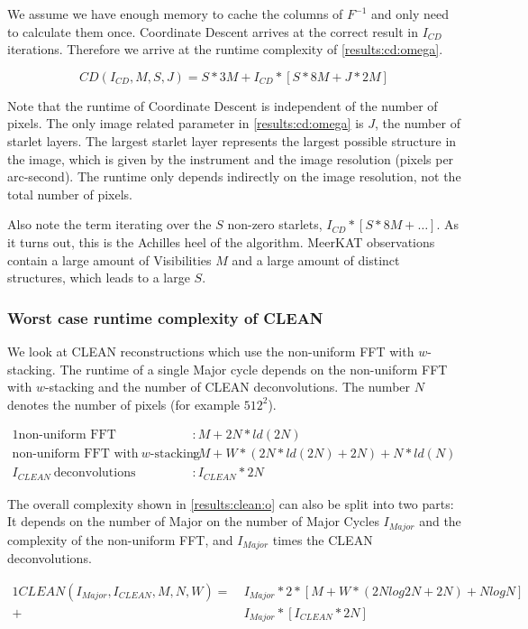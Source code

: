 We assume we have enough memory to cache the columns of $F^{-1}$ and only need to calculate them once. Coordinate Descent arrives at the correct result in $I_{CD}$ iterations. Therefore we arrive at the runtime complexity of \eqref{results:cd:omega}.

\begin{equation}\label{results:cd:omega}
CD(I_{CD}, M, S, J) = S*3M + I_{CD} * [S * 8M + J * 2M]
\end{equation}

Note that the runtime of Coordinate Descent is independent of the number of pixels. The only image related parameter in \eqref{results:cd:omega} is $J$, the number of starlet layers. The largest starlet layer represents the largest possible structure in the image, which is given by the instrument and the image resolution (pixels per arc-second). The runtime only depends indirectly on the image resolution, not the total number of pixels.

Also note the term iterating over the $S$ non-zero starlets, $ I_{CD} * [S * 8M +\ldots]$. As it turns out, this is the Achilles heel of the algorithm. MeerKAT observations contain a large amount of Visibilities $M$ and a large amount of distinct structures, which leads to a large $S$. 

\subsubsection{Worst case runtime complexity of CLEAN}
We look at CLEAN reconstructions which use the non-uniform FFT with $w$-stacking. The runtime of a single Major cycle depends on the non-uniform FFT with $w$-stacking and the number of CLEAN deconvolutions. The number $N$ denotes the number of pixels (for example $512^2$).

\begin{alignat*}{1}
	\text{non-uniform FFT} &: M + 2N*ld(2N)\\
	\text{non-uniform FFT with} \:w\text{-stacking} &:M + W*(2N*ld(2N) + 2N) + N*ld(N)\\
	I_{CLEAN}\: \text{deconvolutions} &: I_{CLEAN}*2N
\end{alignat*}

The overall complexity shown in \eqref{results:clean:o} can also be split into two parts: It depends on the number of Major on the number of Major Cycles $I_{Major}$ and the complexity of the non-uniform FFT, and $I_{Major}$ times the CLEAN deconvolutions. 

\begin{equation}\label{results:clean:o}
\begin{aligned}{1}
CLEAN(I_{Major}, I_{CLEAN}, M, N,  W) =\: &I_{Major} * 2 * [M + W*(2N log 2N + 2N) + N log N]\\
+ &I_{Major} * [I_{CLEAN}*2N]
\end{aligned}
\end{equation}


